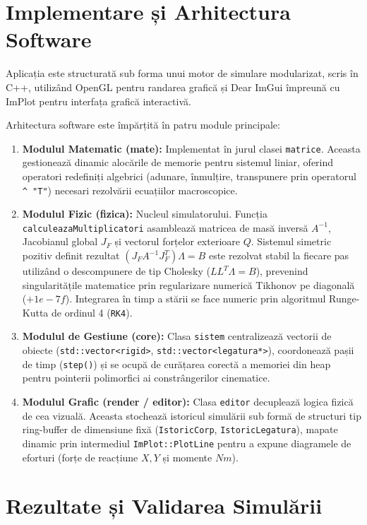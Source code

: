 \documentclass[12pt, a4paper]{article}
\begin{document}
\section{Implementare și Arhitectura Software}

Aplicația este structurată sub forma unui motor de simulare modularizat, scris în C++, utilizând OpenGL pentru randarea grafică și Dear ImGui împreună cu ImPlot pentru interfața grafică interactivă.

Arhitectura software este împărțită în patru module principale:
\begin{enumerate}
    \item \textbf{Modulul Matematic (mate):} Implementat în jurul clasei \texttt{matrice}. Aceasta gestionează dinamic alocările de memorie pentru sistemul liniar, oferind operatori redefiniți algebrici (adunare, înmulțire, transpunere prin operatorul \texttt{\^{} "T"}) necesari rezolvării ecuațiilor macroscopice.
    \item \textbf{Modulul Fizic (fizica):} Nucleul simulatorului. Funcția \texttt{calculeazaMultiplicatori} asamblează matricea de masă inversă $A^{-1}$, Jacobianul global $J_F$ și vectorul forțelor exterioare $Q$. Sistemul simetric pozitiv definit rezultat $(J_F A^{-1} J_F^T)\Lambda = B$ este rezolvat stabil la fiecare pas utilizând o descompunere de tip Cholesky ($L L^T \Lambda = B$), prevenind singularitățile matematice prin regularizare numerică Tikhonov pe diagonală ($+1e-7f$). Integrarea în timp a stării se face numeric prin algoritmul Runge-Kutta de ordinul 4 (\texttt{RK4}).
    \item \textbf{Modulul de Gestiune (core):} Clasa \texttt{sistem} centralizează vectorii de obiecte (\texttt{std::vector<rigid>}, \texttt{std::vector<legatura*>}), coordonează pașii de timp (\texttt{step()}) și se ocupă de curățarea corectă a memoriei din heap pentru pointerii polimorfici ai constrângerilor cinematice.
    \item \textbf{Modulul Grafic (render / editor):} Clasa \texttt{editor} decuplează logica fizică de cea vizuală. Aceasta stochează istoricul simulării sub formă de structuri tip ring-buffer de dimensiune fixă (\texttt{IstoricCorp}, \texttt{IstoricLegatura}), mapate dinamic prin intermediul \texttt{ImPlot::PlotLine} pentru a expune diagramele de eforturi (forțe de reacțiune $X, Y$ și momente $Nm$).
\end{enumerate}

\section{Rezultate și Validarea Simulării}
\end{document}
